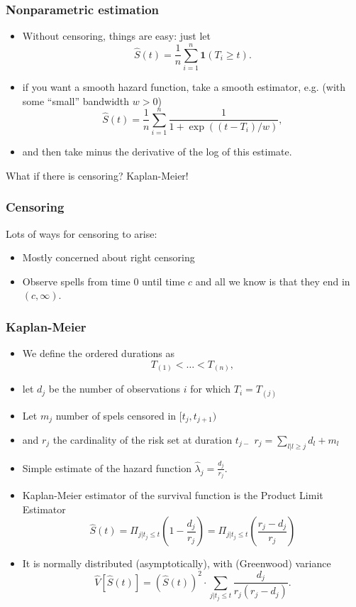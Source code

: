 \documentclass[xcolor=pdftex,dvipsnames,table,mathserif]{beamer}
\begin{document}
\begin{frame}
\frametitle{Nonparametric estimation}
\begin{itemize}

\item Without censoring, things are easy: just let
\[
\hat{S}(t)=\frac{1}{n}\sum_{i=1}^n \mathbf{1} (T_i \geq  t).
\]
\item if you want a smooth hazard function, take a smooth estimator, e.g.
(with some ``small'' bandwidth $w>0$)
\[
\hat{S}(t)=\frac{1}{n}\sum_{i=1}^n \frac{1}{1+\exp((t-T_i)/w)},
\]
\item and then take minus the derivative of the log of this estimate.
\end{itemize}
\alert {What if there is censoring?} Kaplan-Meier!
\end{frame}



\begin{frame}
\frametitle{Censoring}
Lots of ways for censoring to arise:
\begin{itemize}
\item Mostly concerned about \alert{right censoring} 
\item Observe spells from time $0$ until time $c$ and all we know is that they end in $(c,\infty)$.
\end{itemize}
\end{frame}


\begin{frame}
\frametitle{Kaplan-Meier}
\begin{itemize}
\item We define the
ordered durations as 
\[
T_{(1)} < \ldots < T_{(n)},
\]
\item let $d_j$ be the number of observations $i$ for which $T_i=T_{(j)}$
\item Let $m_j$ number of spels censored in $[t_j,t_{j+1})$
\item and $r_j$ the cardinality of the \alert{risk set}  at duration $t_{j-}$   $r_j=\sum_{l | l \geq j} d_l + m_l$
\item Simple estimate of the hazard function $\hat{\lambda}_j = \frac{d_j}{r_j}$.
\item Kaplan-Meier estimator  of the survival function is the \alert{Product Limit Estimator}
\[
\hat{S}(t)=\Pi_{j|t_j \leq t} \left(
1-\frac{d_j}{r_j}
\right) = \Pi_{j|t_j \leq t} \left(
\frac{r_j- d_j}{r_j}
\right)
\]
\item It is normally distributed (asymptotically), with (Greenwood) variance
\[
\hat{V}[\hat{S}(t)]=(\hat{S}(t))^2 \cdot \sum_{j|t_j \leq t}
\frac{d_j}{r_j(r_j-d_j)}.
\]
\end{itemize}
\end{frame}
\end{document}
